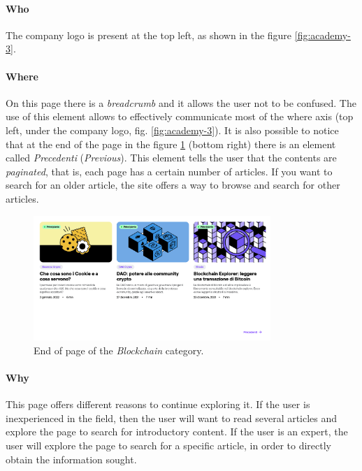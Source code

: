 \paragraph{Who}

The company logo is present at the top left, as shown in the figure 
\ref{fig:academy-3}.

\paragraph{Where}

On this page there is a \textit{breadcrumb} and it allows the user not to 
be confused. The use of this element allows to effectively communicate 
most of the where axis (top left, under the company logo, fig. 
\ref{fig:academy-3}). It is also possible to notice that at the end of the 
page in the figure \ref{fig:academy-4} (bottom right) there is an element 
called \textit{Precedenti} (\textit{Previous}). This element tells the user 
that the contents are \textit{paginated}, that is, each page has a certain 
number of articles. If you want to search for an older article, the site 
offers a way to browse and search for other articles.

\begin{figure}[H]
  \centering
  \includegraphics[width=0.80\textwidth]{res/images/internal-pages/academy/academy-4.png}
  \caption{End of page of the \textit{Blockchain} category.}
  \label{fig:academy-4}
\end{figure}

\paragraph{Why}

This page offers different reasons to continue exploring it. If the user 
is inexperienced in the field, then the user will want to read several 
articles and explore the page to search for introductory content. If the 
user is an expert, the user will explore the page to search for a specific 
article, in order to directly obtain the information sought.

